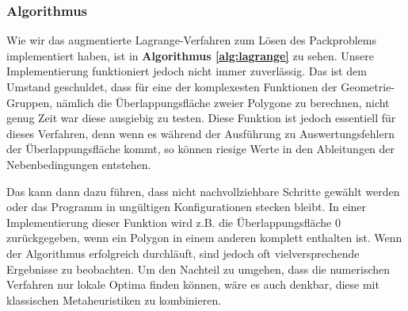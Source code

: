 \documentclass[runningheads,a4paper]{llncs}
\begin{document}
\subsubsection{Algorithmus}
Wie wir das augmentierte Lagrange-Verfahren zum Lösen des Packproblems implementiert haben, ist in \textbf{Algorithmus \ref{alg:lagrange}} zu sehen. Unsere Implementierung funktioniert jedoch nicht immer zuverlässig. Das ist dem Umstand geschuldet, dass für eine der komplexesten Funktionen der Geometrie-Gruppen, nämlich die Überlappungsfläche zweier Polygone zu berechnen, nicht genug Zeit war diese ausgiebig zu testen. Diese Funktion ist jedoch essentiell für dieses Verfahren, denn wenn es während der Ausführung zu Auswertungsfehlern der Überlappungsfläche kommt, so können riesige Werte in den Ableitungen der Nebenbedingungen entstehen.

Das kann dann dazu führen, dass nicht nachvollziehbare Schritte gewählt werden oder das Programm in ungültigen Konfigurationen stecken bleibt. In einer Implementierung dieser Funktion wird z.B. die Überlappungsfläche $0$ zurückgegeben, wenn ein Polygon in einem anderen komplett enthalten ist. Wenn der Algorithmus erfolgreich durchläuft, sind jedoch oft vielversprechende Ergebnisse zu beobachten. Um den Nachteil zu umgehen, dass die numerischen Verfahren nur lokale Optima finden können, wäre es auch denkbar, diese mit klassischen Metaheuristiken zu kombinieren.
\end{document}
